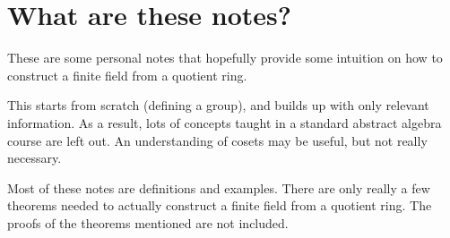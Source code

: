 \section{What are these notes?}

These are some personal notes that hopefully provide some intuition on how to construct a finite field from a quotient ring.

This starts from scratch (defining a group), and builds up with only relevant information. As a result, lots of concepts taught in a standard abstract algebra course are left out. An understanding of cosets may be useful, but not really necessary.

Most of these notes are definitions and examples. There are only really a few theorems needed to actually construct a finite field from a quotient ring. The proofs of the theorems mentioned are not included.

